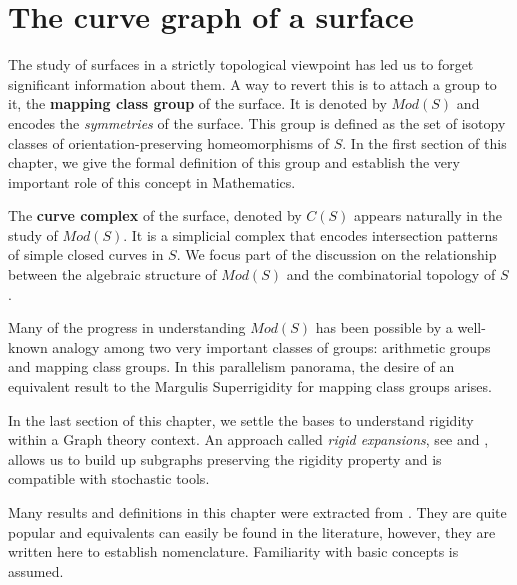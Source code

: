 
\chapter{The curve graph of a surface} %

\label{Chapter1} %



The study of surfaces in a strictly topological viewpoint has led us to forget significant information about them. A way to revert this is to attach a group to it, the \textbf{mapping class group} of the surface. It is denoted by $Mod(S)$ and encodes the \textit{symmetries} of the surface. This group is defined as the set of isotopy classes of orientation-preserving homeomorphisms of $S$. In the first section of this chapter, we give the formal definition of this group and establish the very important role of this concept in Mathematics. 

The \textbf{curve complex} of the surface, denoted by $C(S)$ appears naturally in the study of $Mod(S)$. It is a simplicial complex that encodes intersection patterns of simple closed curves in $S$. We focus part of the discussion on the relationship between the algebraic structure of $Mod(S)$ and the combinatorial topology of $S$.

Many of the progress in understanding $Mod(S)$ has been possible by a well-known analogy among two very important classes of groups: arithmetic groups and mapping class groups. In this parallelism panorama, the desire of an equivalent result to the Margulis Superrigidity for mapping class groups arises.

In the last section of this chapter, we settle the bases to understand rigidity within a Graph theory context. An approach called \textit{rigid expansions}, see \cite[Aramayona, Leininger 16]{finiteRigidSetsJA} and \cite[Hernandez 19]{exhaustionCurveGraph}, allows us to build up subgraphs preserving the rigidity property and is compatible with stochastic tools.
 
Many results and definitions in this chapter were extracted from \cite[Farb]{Farb}. They are quite popular and equivalents can easily be found in the literature, however, they are written here to establish nomenclature. Familiarity with basic concepts is assumed.

